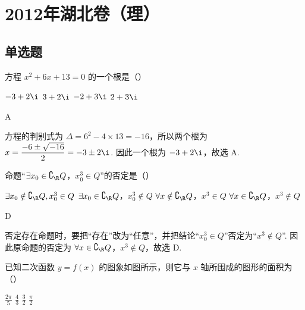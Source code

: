 
\chapter{2012年湖北卷（理）}

\section{单选题}

\begin{problem}
方程 \(x^{2} + 6x + 13 = 0\) 的一个根是（\quad）

\choices
    {\(-3 + 2\i\)}
    {\(3 + 2\i\)}
    {\(-2 + 3\i\)}
    {\(2 + 3\i\)}
\end{problem}

\begin{answer}
A
\end{answer}

\begin{solution}
方程的判别式为 \(\Delta=6^{2}-4\times13=-16\)，所以两个根为 \(x=\dfrac{-6\pm\sqrt{-16}}{2}=-3\pm2\i\). 因此一个根为 \(-3+2\i\)，故选 A.
\end{solution}

\begin{problem}
命题“\(\exists x_0 \in \complement_{\R} Q\)，\(x_0^3 \in Q\)”的否定是（\quad）

\choices
    {\(\exists x_0 \notin \complement_{\R} Q, x_0^3 \in Q\)}
    {\(\exists x_0 \in \complement_{\R} Q\)，\(x_0^3 \notin Q\)}
    {\(\forall x \notin \complement_{\R} Q\)，\(x^3 \in Q\)}
    {\(\forall x \in \complement_{\R} Q\)，\(x^3 \notin Q\)}
\end{problem}

\begin{answer}
D
\end{answer}

\begin{solution}
否定存在命题时，要把“存在”改为“任意”，并把结论“\(x_0^3\in Q\)”否定为“\(x^3\notin Q\)”. 因此原命题的否定为 \(\forall x\in\complement_{\R}Q\)，\(x^3\notin Q\)，故选 D.
\end{solution}

\begin{problem}
已知二次函数 \( y = f(x) \) 的图象如图所示，则它与 \( x \) 轴所围成的图形的面积为（\quad）


\choices
    {\( \frac{2\pi}{5} \)}
    {\( \frac{4}{3} \)}
    {\( \frac{3}{2} \)}
    {\( \frac{\pi}{2} \)}
\end{problem}

